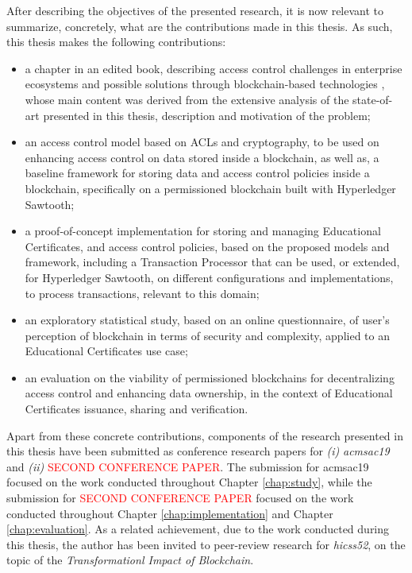 After describing the objectives of the presented research, it is now relevant to summarize, concretely, what are the contributions made in this thesis. As such, this thesis makes the following contributions:

\begin{itemize}
	\item a chapter in an edited book, describing access control challenges in enterprise ecosystems and possible solutions through blockchain-based technologies \cite{bryan_christiansen_access_2018}, whose main content was derived from the extensive analysis of the state-of-art presented in this thesis, description and motivation of the problem;
	\item an access control model based on ACLs and cryptography, to be used on enhancing access control on data stored inside a blockchain, as well as, a baseline framework for storing data and access control policies inside a blockchain, specifically on a permissioned blockchain built with Hyperledger Sawtooth;
	\item a proof-of-concept implementation for storing and managing Educational Certificates, and access control policies, based on the proposed models and framework, including a Transaction Processor that can be used, or extended, for Hyperledger Sawtooth, on different configurations and implementations, to process transactions, relevant to this domain;
	\item an exploratory statistical study, based on an online questionnaire, of user's perception of blockchain in terms of security and complexity, applied to an Educational Certificates use case;
	\item an evaluation on the viability of permissioned blockchains for decentralizing access control and enhancing data ownership, in the context of Educational Certificates issuance, sharing and verification.
\end{itemize}

Apart from these concrete contributions, components of the research presented in this thesis have been submitted as conference research papers for \emph{(i)} \textit{\gls{acmsac19}} and \emph{(ii)} \textcolor{red}{SECOND CONFERENCE PAPER}. The submission for \gls{acmsac19} focused on the work conducted throughout Chapter \ref{chap:study}, while the submission for \textcolor{red}{SECOND CONFERENCE PAPER} focused on the work conducted throughout Chapter \ref{chap:implementation} and Chapter \ref{chap:evaluation}. As a related achievement, due to the work conducted during this thesis, the author has been invited to peer-review research for \textit{\glsdesc{hicss52}}, on the topic of the \textit{Transformationl Impact of Blockchain}.

